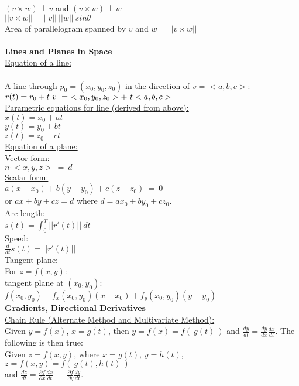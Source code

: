 \documentclass[10pt]{extarticle}
\begin{document}
\noindent
$(v \times w) \perp v$ and $(v \times w) \perp w$\\
$||v \times w|| = ||v|| \ ||w|| \ sin \theta$\\
Area of parallelogram spanned by $v$ and $w$ = $||v \times w||$\\\\
\textbf{Lines and Planes in Space}\\
\noindent
\underline{Equation of a line:}\\\\
A line through $p_0 = (x_0,y_0,z_0)$ in the direction of $v = <a,b,c>$:\\
$
r(t) = r_0 + t \ v \ =  \ <x_0,y_0,z_0> + \ t <a,b,c>\\
$\\
\underline{Parametric equations for line (derived from above):}\\
$x(t) = x_0 + at$\\
$y(t) = y_0 + bt$ \\
$z(t) = z_0 + ct$\\


\noindent
\underline{Equation of a plane:}\\
\underline{Vector form:}\\
$n \cdot <x,y,z> \ = \ d$\\
\noindent
\underline{Scalar form:}\\
$a(x-x_0) + b(y-y_0) + c(z-z_0) \ = \ 0$\\
or $ax+by+cz = d$ where $d = ax_0 + by_0 + cz_0$.\\
\noindent
\underline{Arc length:}\\
$
s(t) = \int_0^T ||r'(t)|| \ dt
$\\
\noindent
\underline{Speed:}\\
$
\frac{d}{dt}s(t) = ||r'(t)||
$\\

\underline{Tangent plane:}\\
For $z = f(x,y)$:\\
tangent plane at $(x_0,y_0)$: $f(x_0,y_0)+f_x(x_0,y_0)(x-x_0)+f_y(x_0,y_0)(y-y_0)$\\

\textbf{Gradients, Directional Derivatives}\\
\underline{Chain Rule (Alternate Method and Multivariate Method):}\\
Given $y= f(x)$, $x= g(t)$, then $y = f(x) = f( \ g(t) \ )$ and $\frac{dy}{dt} = \frac{dy}{dx} \frac{dx}{dt}$.
The following is then true:\\
Given $z = f(x,y)$, where $x= g(t)$, $y= h(t)$, $z = f(x,y) = f( \ g(t), h(t) \ )$\\
and $\frac{dz}{dt} = \frac{\partial{f}}{\partial{x}} \frac{dx}{dt} \ + \ \frac{\partial{f}}{\partial{y}} \frac{dy}{dt}$.\\
\end{document}
